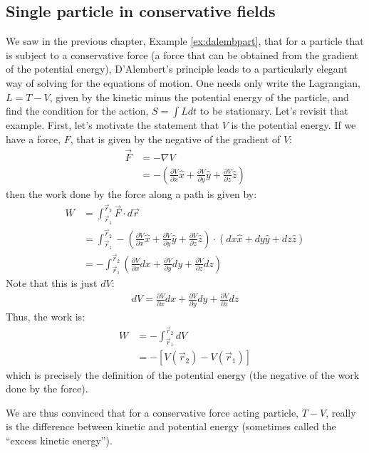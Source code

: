 \subsection{Single particle in conservative fields}
We saw in the previous chapter, Example \ref{ex:dalembpart}, that for a particle that is subject to a conservative force (a force that can be obtained from the gradient of the potential energy), D'Alembert's principle leads to a particularly elegant way of solving for the equations of motion. One needs only write the Lagrangian, $L=T-V$, given by the kinetic minus the potential energy of the particle, and find the condition for the action, $S=\int Ldt$ to be stationary. Let's revisit that example. First, let's motivate the statement that $V$ is the potential energy. If we have a force, $F$, that is given by the negative of the gradient of $V$:
\begin{align}
\vec{F}&=-\nabla V\nonumber\\
&=-\left(\frac{\partial V}{\partial x} \hat{x} + \frac{\partial V}{\partial y} \hat{y}+\frac{\partial V}{\partial z} \hat{z} \right)
\end{align}
then the work done by the force along a path is given by:
\begin{align}
W&=\int_{\vec{r}_1}^{\vec{r}_2} \vec{F}\cdot d\vec{r}\nonumber\\
&=\int_{\vec{r}_1}^{\vec{r}_2} -\left(\frac{\partial V}{\partial x} \hat{x} + \frac{\partial V}{\partial y} \hat{y}+\frac{\partial V}{\partial z} \hat{z} \right) \cdot (dx \hat{x}+dy \hat{y} +dz \hat{z} )\nonumber\\
&=-\int_{\vec{r}_1}^{\vec{r}_2} \left(\frac{\partial V}{\partial x} dx + \frac{\partial V}{\partial y} dy +\frac{\partial V}{\partial z} dz\right)
\end{align}
Note that this is just $dV$:
\begin{align}
dV=\frac{\partial V}{\partial x} dx + \frac{\partial V}{\partial y} dy +\frac{\partial V}{\partial z} dz
\end{align}
Thus, the work is:
\begin{align}
W&=-\int_{\vec{r}_1}^{\vec{r}_2}dV\nonumber\\
&=-\left [ V(\vec{r}_2)-V(\vec{r}_1)\right ]
\end{align}
which is precisely the definition of the potential energy (the negative of the work done by the force).

We are thus convinced that for a conservative force acting particle, $T-V$, really is the difference between kinetic and potential energy (sometimes called the ``excess kinetic energy'').

